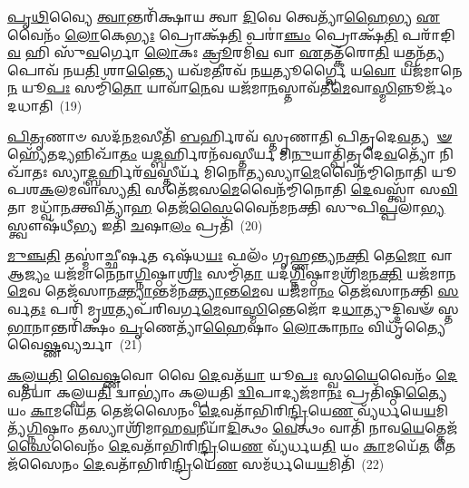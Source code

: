 {\anuvakamend[{\-\ul{𑌜𑍁}\-\-\ul{𑌷𑍇} 𑌸𑌤𑍇᳴𑌜\-\ul{𑌸}\-𑌮𑌨᳴𑌕𑍍𑌷𑌸𑌙𑍍𑌗𑌂 𑌬𑌹𑍁\-\ul{𑌶𑌾}\-𑌖𑌂 𑌵𑍃᳴𑌶𑍍𑌚𑍇\-\ul{𑌦𑍇}\-𑌷 𑌵𑍈 \ul{𑌯}\-𑌜𑍍𑌞 𑌉𑌪𑍈᳴\-\ul{𑌨}\-𑌮𑍁𑌤𑍍𑌤᳴𑌰𑍋 \ul{𑌯}\-𑌜𑍍𑌞 𑌆\-\ul{𑌪𑍍𑌤𑍍𑌯𑌾} 𑌏\-\ul{𑌕𑌾}\-𑌨𑍍𑌨𑌵𑌿𑍞᳴\-\ul{𑌶}\-𑌤𑌿𑌶𑍍𑌚᳴}]}%

\-\ul{𑌪𑍃}\-\-\ul{𑌥𑌿}\-𑌵𑍍𑌯𑍈 \ul{𑌤𑍍𑌵𑌾}\-𑌨𑍍𑌤𑌰𑌿᳴𑌕𑍍𑌷𑌾𑌯 𑌤𑍍𑌵𑌾 \ul{𑌦𑌿}\-𑌵𑍇 𑌤𑍍𑌵𑍇𑌤𑍍𑌯𑌾᳴\-\ul{𑌹𑍈}\-𑌭𑍍𑌯 \ul{𑌏}\-𑌵𑍈𑌨𑌂᳴ \ul{𑌲𑍋}\-𑌕𑍇\-\ul{𑌭𑍍𑌯𑌃} 𑌪𑍍𑌰𑍋𑌕𑍍𑌷᳴\-\ul{𑌤𑌿} 𑌪𑌰𑌾॑\-\ul{𑌞𑍍𑌚𑌂} 𑌪𑍍𑌰𑍋𑌕𑍍𑌷᳴\-\ul{𑌤𑌿} 𑌪𑌰𑌾᳴𑌙𑌿\-\ul{𑌵} 𑌹𑌿 𑌸𑍁᳴\-\ul{𑌵}\-𑌰𑍍𑌗𑍋 \ul{𑌲𑍋}\-𑌕𑌃 \ul{𑌕𑍍𑌰𑍂}\-𑌰𑌮𑌿᳴\-\ul{𑌵} 𑌵𑌾 \ul{𑌏}\-𑌤𑌤𑍍𑌕᳴𑌰𑍋\-\ul{𑌤𑌿} 𑌯𑌤𑍍𑌖𑌨᳴\-\ul{𑌤𑍍𑌯}\-𑌪𑍋𑌵᳴ 𑌨𑌯\-\ul{𑌤𑌿} 𑌶𑌾\-\ul{𑌨𑍍𑌤𑍍𑌯𑍈} 𑌯𑌵᳴𑌮\-\ul{𑌤𑍀}\-𑌰𑌵᳴ 𑌨\-\ul{𑌯}\-𑌤𑍍𑌯𑍂𑌰𑍍𑌗𑍍𑌵𑍈 𑌯\-\ul{𑌵𑍋} 𑌯𑌜᳴𑌮𑌾𑌨𑍇\-\ul{𑌨} 𑌯𑍂\-\ul{𑌪𑌃} 𑌸𑌮𑍍𑌮𑌿᳴\-\ul{𑌤𑍋} 𑌯𑌾𑌵𑌾᳴\-\ul{𑌨𑍇}\-𑌵 𑌯𑌜᳴𑌮𑌾\-\ul{𑌨}\-𑌸𑍍𑌤𑌾𑌵᳴𑌤𑍀\-\ul{𑌮𑍇}\-𑌵𑌾\-\ul{𑌸𑍍𑌮𑌿}\-𑌨𑍍𑌨𑍂𑌰𑍍𑌜𑌂᳴ 𑌦𑌧𑌾𑌤𑌿~(19)

\-\ul{𑌪𑌿}\-\-\ul{𑌤𑍃}\-𑌣𑌾𑍞 𑌸𑌦᳴𑌨\-\ul{𑌮}\-𑌸𑍀𑌤𑌿᳴ \ul{𑌬}\-𑌰𑍍\mbox{}𑌹𑌿𑌰𑌵᳴ 𑌸𑍍𑌤𑍃𑌣𑌾𑌤𑌿 𑌪𑌿𑌤𑍃𑌦𑍇\-\ul{𑌵}\-𑌤𑍍𑌯 \-\ul{𑍟} 𑌹𑍍𑌯𑍇᳴𑌤𑌦𑍍𑌯𑌨𑍍𑌨𑌿𑌖𑌾᳴\-\ul{𑌤𑌂} 𑌯\-\ul{𑌦𑍍𑌬}\-𑌰𑍍\mbox{}𑌹𑌿𑌰𑌨᳴𑌵𑌸𑍍𑌤𑍀𑌰𑍍𑌯 𑌮𑌿\-\ul{𑌨𑍁}\-𑌯𑌾𑌤𑍍𑌪𑌿᳴𑌤𑍃𑌦𑍇\-\ul{𑌵}\-𑌤𑍍𑌯𑍋᳴ 𑌨𑌿𑌖𑌾᳴𑌤𑌃 𑌸𑍍𑌯𑌾\-\ul{𑌦𑍍𑌬}\-𑌰𑍍\mbox{}𑌹𑌿𑌰᳴\-\ul{𑌵}\-𑌸𑍍𑌤𑍀𑌰𑍍𑌯᳴ 𑌮𑌿𑌨𑍋\-\ul{𑌤𑍍𑌯}\-𑌸𑍍𑌯𑌾\-\ul{𑌮𑍇}\-𑌵𑍈𑌨᳴𑌮𑍍𑌮𑌿𑌨𑍋𑌤𑌿 𑌯𑍂𑌪𑌶\-\ul{𑌕}\-𑌲𑌮𑌵𑌾॑𑌸𑍍𑌯\-\ul{𑌤𑌿} 𑌸𑌤𑍇᳴𑌜𑌸\-\ul{𑌮𑍇}\-𑌵𑍈𑌨᳴𑌮𑍍𑌮𑌿𑌨𑍋𑌤𑌿 \ul{𑌦𑍇}\-𑌵𑌸𑍍𑌤𑍍𑌵𑌾᳴ 𑌸\-\ul{𑌵𑌿}\-𑌤𑌾 𑌮𑌧𑍍𑌵𑌾᳴\-\ul{𑌨}\-𑌕𑍍𑌤𑍍𑌵𑌿𑌤𑍍𑌯𑌾᳴\-\ul{𑌹} 𑌤𑍇𑌜᳴\-\ul{𑌸𑍈}\-𑌵𑍈𑌨᳴𑌮𑌨𑌕𑍍𑌤𑌿 𑌸𑍁𑌪𑌿\-\ul{𑌪𑍍𑌪}\-𑌲𑌾\-\ul{𑌭𑍍𑌯}\-𑌸𑍍𑌤𑍍𑌵𑍗𑌷᳴𑌧𑍀\-\ul{𑌭𑍍𑌯} 𑌇𑌤𑌿᳴ \ul{𑌚}\-𑌷𑌾\-\ul{𑌲𑌂} 𑌪𑍍𑌰𑌤𑌿᳴~(20)

\-\ul{𑌮𑍁}\-\-\ul{𑌞𑍍𑌚}\-\-\ul{𑌤𑌿} 𑌤𑌸𑍍𑌮𑌾॑𑌚𑍍𑌛𑍀𑌰𑍍\mbox{}\-\ul{𑌷}\-𑌤 𑌓𑌷᳴𑌧\-\ul{𑌯𑌃} 𑌫𑌲𑌂᳴ 𑌗𑍃𑌹𑍍𑌣\-\ul{𑌨𑍍𑌤𑍍𑌯}\-𑌨\-\ul{𑌕𑍍𑌤𑌿} 𑌤𑍇\-\ul{𑌜𑍋} 𑌵𑌾 𑌆\-\ul{𑌜𑍍𑌯𑌂} 𑌯𑌜᳴𑌮𑌾𑌨𑍇𑌨𑌾\-\ul{𑌗𑍍𑌨𑌿}\-𑌷𑍍𑌠𑌾\-\ul{𑌶𑍍𑌰𑌿𑌃} 𑌸𑌮𑍍𑌮𑌿᳴\-\ul{𑌤𑌾} 𑌯𑌦᳴\-\ul{𑌗𑍍𑌨𑌿}\-𑌷𑍍𑌠𑌾\-𑌮𑌶𑍍𑌰𑌿᳴\-\ul{𑌮}\-𑌨\-\ul{𑌕𑍍𑌤𑌿} 𑌯𑌜᳴𑌮𑌾𑌨\-\ul{𑌮𑍇}\-𑌵 𑌤𑍇𑌜᳴𑌸𑌾𑌨\-\ul{𑌕𑍍𑌤𑍍𑌯𑌾}\-𑌨𑍍𑌤𑌮᳴𑌨\-\ul{𑌕𑍍𑌤𑍍𑌯𑌾}\-𑌨𑍍𑌤\-\ul{𑌮𑍇}\-𑌵 𑌯𑌜᳴𑌮𑌾\-\ul{𑌨𑌂} 𑌤𑍇𑌜᳴𑌸𑌾𑌨𑌕𑍍𑌤𑌿 \ul{𑌸}\-𑌰𑍍𑌵\-\ul{𑌤𑌃} 𑌪𑌰𑌿᳴ 𑌮𑍃\-\ul{𑌶}\-𑌤𑍍𑌯𑌪᳴𑌰𑌿𑌵𑌰𑍍𑌗\-\ul{𑌮𑍇}\-𑌵𑌾\-\-\ul{𑌸𑍍𑌮𑌿}\-𑌨𑍍𑌤𑍇𑌜𑍋᳴ 𑌦\-\ul{𑌧𑌾}\-𑌤𑍍𑌯𑍁𑌦𑍍𑌦𑌿𑌵𑍟᳴ 𑌸𑍍𑌤\-\ul{𑌭𑌾}\-𑌨𑌾𑌨𑍍𑌤𑌰𑌿᳴𑌕𑍍𑌷𑌂 \ul{𑌪𑍃}\-𑌣𑍇𑌤𑍍𑌯𑌾᳴\-\ul{𑌹𑍈}\-𑌷𑌾𑌂 \ul{𑌲𑍋}\-𑌕𑌾\-\ul{𑌨𑌾𑌂} 𑌵𑌿𑌧𑍃᳴𑌤𑍍𑌯𑍈 𑌵𑍈\-\ul{𑌷𑍍𑌣}\-𑌵𑍍𑌯𑌰𑍍𑌚𑌾~(21)

\-\ul{𑌕}\-\-\ul{𑌲𑍍𑌪}\-\-\ul{𑌯}\-\-\ul{𑌤𑌿} \ul{𑌵𑍈}\-\-\ul{𑌷𑍍𑌣}\-𑌵𑍋 𑌵𑍈 \ul{𑌦𑍇}\-𑌵𑌤᳴\-\ul{𑌯𑌾} 𑌯𑍂\-\ul{𑌪𑌃} 𑌸𑍍𑌵\-\ul{𑌯𑍈}\-𑌵𑍈𑌨𑌂᳴ \ul{𑌦𑍇}\-𑌵𑌤᳴𑌯𑌾 𑌕𑌲𑍍𑌪𑌯\-\ul{𑌤𑌿} 𑌦𑍍𑌵𑌾\-𑌭𑍍𑌯𑌾𑌂॑ 𑌕𑌲𑍍𑌪𑌯𑌤𑌿 \ul{𑌦𑍍𑌵𑌿}\-𑌪𑌾𑌦𑍍𑌯𑌜᳴𑌮𑌾\-\ul{𑌨𑌃} 𑌪𑍍𑌰𑌤𑌿᳴𑌷𑍍𑌠𑌿\-\ul{𑌤𑍍𑌯𑍈} 𑌯𑌂 \ul{𑌕𑌾}\-𑌮𑌯𑍇᳴\-\ul{𑌤} 𑌤𑍇𑌜᳴𑌸𑍈𑌨𑌂 \ul{𑌦𑍇}\-𑌵𑌤𑌾᳴𑌭𑌿𑌰𑌿\-\ul{𑌨𑍍𑌦𑍍𑌰𑌿}\-𑌯𑍇\-\ul{𑌣} 𑌵𑍍𑌯᳴𑌰𑍍𑌧𑌯𑍇\-\ul{𑌯}\-𑌮𑌿𑌤𑍍𑌯᳴\-\ul{𑌗𑍍𑌨𑌿}\-𑌷𑍍𑌠𑌾𑌂 𑌤𑌸𑍍𑌯𑌾𑌶𑍍𑌰𑌿᳴𑌮𑌾𑌹\-\ul{𑌵}\-𑌨𑍀𑌯𑌾᳴\-\ul{𑌦𑌿}\-𑌤𑍍𑌥𑌂 \ul{𑌵𑍇}\-𑌤𑍍𑌥𑌂 𑌵𑌾𑌤𑌿᳴ 𑌨𑌾𑌵\-\ul{𑌯𑍇}\-𑌤𑍍𑌤𑍇𑌜᳴\-\ul{𑌸𑍈}\-𑌵𑍈𑌨𑌂᳴ \ul{𑌦𑍇}\-𑌵𑌤𑌾᳴𑌭𑌿𑌰𑌿\-\ul{𑌨𑍍𑌦𑍍𑌰𑌿}\-𑌯𑍇\-\ul{𑌣} 𑌵𑍍𑌯᳴𑌰𑍍𑌧𑌯\-\ul{𑌤𑌿} 𑌯𑌂 \ul{𑌕𑌾}\-𑌮𑌯𑍇᳴\-\ul{𑌤} 𑌤𑍇𑌜᳴𑌸𑍈𑌨𑌂 \ul{𑌦𑍇}\-𑌵𑌤𑌾᳴𑌭𑌿𑌰𑌿\-\ul{𑌨𑍍𑌦𑍍𑌰𑌿}\-𑌯𑍇\-\ul{𑌣} 𑌸𑌮᳴𑌰𑍍𑌧𑌯𑍇\-\ul{𑌯}\-𑌮𑌿𑌤𑌿᳴~(22)

